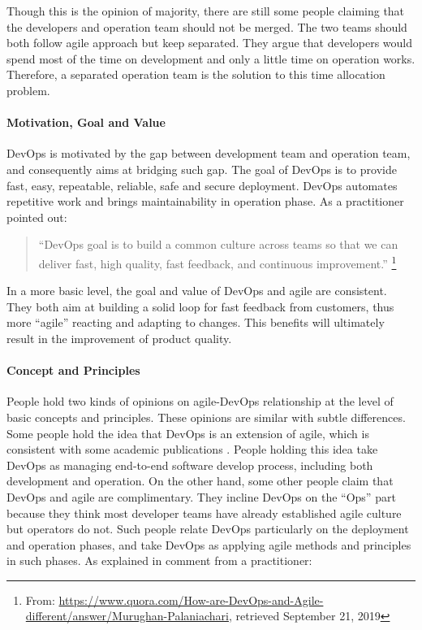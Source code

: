 \documentclass[
  12pt,
  a4paper,
]{article}
\begin{document}
Though this is the opinion of majority, there are still some people
claiming that the developers and operation team should not be merged.
The two teams should both follow agile approach but keep separated. They
argue that developers would spend most of the time on development and
only a little time on operation works. Therefore, a separated operation
team is the solution to this time allocation problem.

\hypertarget{motivation-goal-and-value}{%
\paragraph{Motivation, Goal and Value}\label{motivation-goal-and-value}}

DevOps is motivated by the gap between development team and operation
team, and consequently aims at bridging such gap. The goal of DevOps is
to provide fast, easy, repeatable, reliable, safe and secure deployment.
DevOps automates repetitive work and brings maintainability in operation
phase. As a practitioner pointed out:

\begin{quote}
``DevOps goal is to build a common culture across teams so that we can
deliver fast, high quality, fast feedback, and continuous improvement.''
\footnote{From:
  \url{https://www.quora.com/How-are-DevOps-and-Agile-different/answer/Murughan-Palaniachari},
  retrieved September 21, 2019}
\end{quote}

In a more basic level, the goal and value of DevOps and agile are
consistent. They both aim at building a solid loop for fast feedback
from customers, thus more ``agile'' reacting and adapting to changes.
This benefits will ultimately result in the improvement of product
quality.

\hypertarget{concept-and-principles}{%
\paragraph{Concept and Principles}\label{concept-and-principles}}

People hold two kinds of opinions on agile-DevOps relationship at the
level of basic concepts and principles. These opinions are similar with
subtle differences. Some people hold the idea that DevOps is an
extension of agile, which is consistent with some academic publications
\citep{huttermann2012devops-Developers}
\citep{Jabbari:2016:what-is-devops} \citep{lwakatare2016:relationship}.
People holding this idea take DevOps as managing end-to-end software
develop process, including both development and operation. On the other
hand, some other people claim that DevOps and agile are complimentary.
They incline DevOps on the ``Ops'' part because they think most
developer teams have already established agile culture but operators do
not. Such people relate DevOps particularly on the deployment and
operation phases, and take DevOps as applying agile methods and
principles in such phases. As explained in comment from a practitioner:
\end{document}
